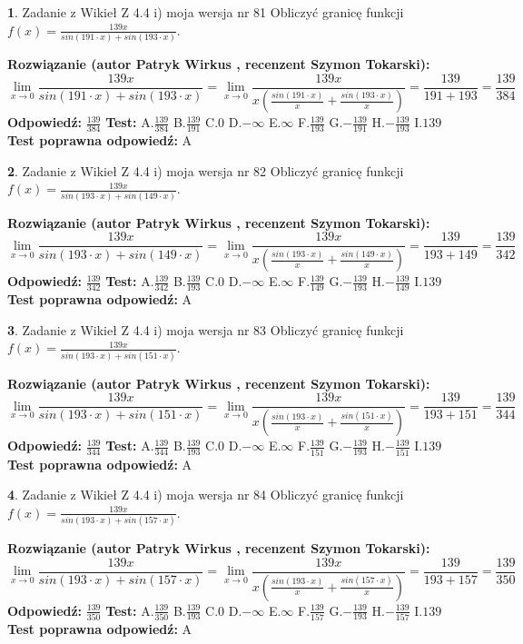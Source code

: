 \documentclass[12pt, a4paper]{article}
\theoremstyle{definition} %
\newtheorem{zad}{}
\newcommand{\zadStart}[1]{\begin{zad}#1\newline}
\newcommand{\zadStop}{\end{zad}}
\newcommand{\rozwStart}[2]{\noindent \textbf{Rozwiązanie (autor #1 , recenzent #2): }\newline}
\newcommand{\rozwStop}{\newline}
\newcommand{\odpStart}{\noindent \textbf{Odpowiedź:}\newline}
\newcommand{\odpStop}{\newline}
\newcommand{\testStart}{\noindent \textbf{Test:}\newline}
\newcommand{\testStop}{\newline}
\newcommand{\kluczStart}{\noindent \textbf{Test poprawna odpowiedź:}\newline}
\newcommand{\kluczStop}{\newline}
\begin{document}
\zadStart{Zadanie z Wikieł Z 4.4 i) moja wersja nr 81}
Obliczyć granicę funkcji $f(x)=\frac{139x}{sin(191\cdot x) +sin(193\cdot x)}$.
\zadStop
\rozwStart{Patryk Wirkus}{Szymon Tokarski}
$$\lim\limits_{x\to 0}\frac{139x}{sin(191\cdot x) +sin(193\cdot x)}=\lim\limits_{x\to 0}\frac{139x}{x(\frac{sin(191\cdot x)}{x}+\frac{sin(193\cdot x)}{x})}=\frac{139}{191+193} = \frac{139}{384}$$
\rozwStop
\odpStart
$\frac{139}{384}$
\odpStop
\testStart
A.$\frac{139}{384}$
B.$\frac{139}{191}$
C.$0$
D.$-\infty$
E.$\infty$
F.$\frac{139}{193}$
G.$-\frac{139}{191}$
H.$-\frac{139}{193}$
I.$139$
\testStop
\kluczStart
A
\kluczStop



\zadStart{Zadanie z Wikieł Z 4.4 i) moja wersja nr 82}
Obliczyć granicę funkcji $f(x)=\frac{139x}{sin(193\cdot x) +sin(149\cdot x)}$.
\zadStop
\rozwStart{Patryk Wirkus}{Szymon Tokarski}
$$\lim\limits_{x\to 0}\frac{139x}{sin(193\cdot x) +sin(149\cdot x)}=\lim\limits_{x\to 0}\frac{139x}{x(\frac{sin(193\cdot x)}{x}+\frac{sin(149\cdot x)}{x})}=\frac{139}{193+149} = \frac{139}{342}$$
\rozwStop
\odpStart
$\frac{139}{342}$
\odpStop
\testStart
A.$\frac{139}{342}$
B.$\frac{139}{193}$
C.$0$
D.$-\infty$
E.$\infty$
F.$\frac{139}{149}$
G.$-\frac{139}{193}$
H.$-\frac{139}{149}$
I.$139$
\testStop
\kluczStart
A
\kluczStop



\zadStart{Zadanie z Wikieł Z 4.4 i) moja wersja nr 83}
Obliczyć granicę funkcji $f(x)=\frac{139x}{sin(193\cdot x) +sin(151\cdot x)}$.
\zadStop
\rozwStart{Patryk Wirkus}{Szymon Tokarski}
$$\lim\limits_{x\to 0}\frac{139x}{sin(193\cdot x) +sin(151\cdot x)}=\lim\limits_{x\to 0}\frac{139x}{x(\frac{sin(193\cdot x)}{x}+\frac{sin(151\cdot x)}{x})}=\frac{139}{193+151} = \frac{139}{344}$$
\rozwStop
\odpStart
$\frac{139}{344}$
\odpStop
\testStart
A.$\frac{139}{344}$
B.$\frac{139}{193}$
C.$0$
D.$-\infty$
E.$\infty$
F.$\frac{139}{151}$
G.$-\frac{139}{193}$
H.$-\frac{139}{151}$
I.$139$
\testStop
\kluczStart
A
\kluczStop



\zadStart{Zadanie z Wikieł Z 4.4 i) moja wersja nr 84}
Obliczyć granicę funkcji $f(x)=\frac{139x}{sin(193\cdot x) +sin(157\cdot x)}$.
\zadStop
\rozwStart{Patryk Wirkus}{Szymon Tokarski}
$$\lim\limits_{x\to 0}\frac{139x}{sin(193\cdot x) +sin(157\cdot x)}=\lim\limits_{x\to 0}\frac{139x}{x(\frac{sin(193\cdot x)}{x}+\frac{sin(157\cdot x)}{x})}=\frac{139}{193+157} = \frac{139}{350}$$
\rozwStop
\odpStart
$\frac{139}{350}$
\odpStop
\testStart
A.$\frac{139}{350}$
B.$\frac{139}{193}$
C.$0$
D.$-\infty$
E.$\infty$
F.$\frac{139}{157}$
G.$-\frac{139}{193}$
H.$-\frac{139}{157}$
I.$139$
\testStop
\kluczStart
A
\kluczStop
\end{document}
